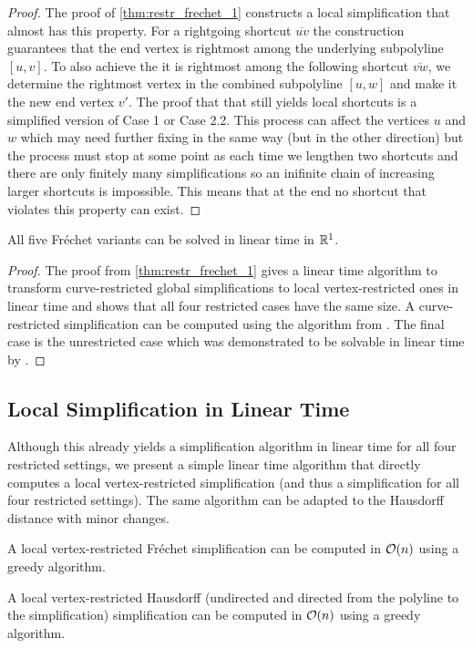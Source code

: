 \begin{proof}
	The proof of \cref{thm:restr_frechet_1} constructs a local simplification that almost has this property. For a rightgoing shortcut \(\overline{uv}\) the construction guarantees that the end vertex is rightmost among the underlying subpolyline \([u, v]\). To also achieve the it is rightmost among the following shortcut \(\overline{vw}\), we determine the rightmost vertex in the combined subpolyline \([u, w]\) and make it the new end vertex \(v'\). The proof that that still yields local shortcuts is a simplified version of Case 1 or Case 2.2. This process can affect the vertices \(u\) and \(w\) which may need further fixing in the same way (but in the other direction) but the process must stop at some point as each time we lengthen two shortcuts and there are only finitely many simplifications so an inifinite chain of increasing larger shortcuts is impossible. This means that at the end no shortcut that violates this property can exist.
\end{proof}

\begin{corollary}\label{cor:frechet1dall}
	All five Fréchet variants can be solved in linear time in \(\mathbb{R}^1\).
\end{corollary}

\begin{proof}
	The proof from \cref{thm:restr_frechet_1} gives a linear time algorithm to transform curve-restricted global simplifications to local vertex-restricted ones in linear time and shows that all four restricted cases have the same size. A curve-restricted simplification can be computed using the algorithm from \citeauthor{global_curve_simplification}. The final case is the unrestricted case which was demonstrated to be solvable in linear time by \citeauthor{min_complexity_1d_unrestricted}.
\end{proof}

\subsection{Local Simplification in Linear Time}
Although this already yields a simplification algorithm in linear time for all four restricted settings, we present a simple linear time algorithm that directly computes a local vertex-restricted simplification (and thus a simplification for all four restricted settings). The same algorithm can be adapted to the Hausdorff distance with minor changes.

\begin{theorem}
	A local vertex-restricted Fréchet simplification can be computed in \(\mathcal{O}(n)\) using a greedy algorithm.

	A local vertex-restricted Hausdorff (undirected and directed from the polyline to the simplification) simplification can be computed in \(\mathcal{O}(n)\) using a greedy algorithm.
\end{theorem}

